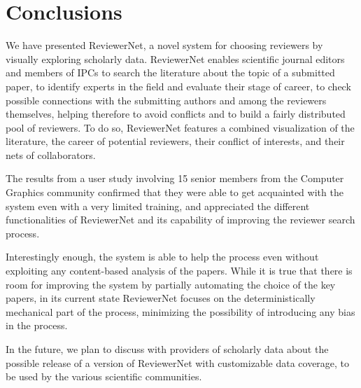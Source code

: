 \chapter{Conclusions}
\label{sec:conclusions}

We have presented ReviewerNet, a novel system for choosing reviewers by visually exploring scholarly data. ReviewerNet enables scientific journal editors and members of IPCs to search the literature about the topic of a submitted paper, to identify experts in the field and evaluate their stage of career, to check possible connections with the submitting authors and among the reviewers themselves, helping therefore to avoid conflicts and to build a fairly distributed pool of reviewers. To do so, ReviewerNet features a combined visualization of the literature, the career of potential reviewers, their conflict of interests, and their nets of collaborators. 

The results from a user study involving 15 senior members from the Computer Graphics community confirmed that they were able to get acquainted with the system even with a very limited training, and  appreciated the different functionalities of ReviewerNet and its capability of improving the reviewer search process.

Interestingly enough, the system is able to help the process even without exploiting any content-based analysis of the papers. While it is true that there is room for improving the system by partially automating the choice of the key papers, in its current state ReviewerNet focuses on the deterministically mechanical part of the process, minimizing the possibility of introducing any bias in the process. 

In the future, we plan to discuss with providers of scholarly data about the possible release of a version of ReviewerNet with customizable data coverage, to be used by the various scientific communities.  

